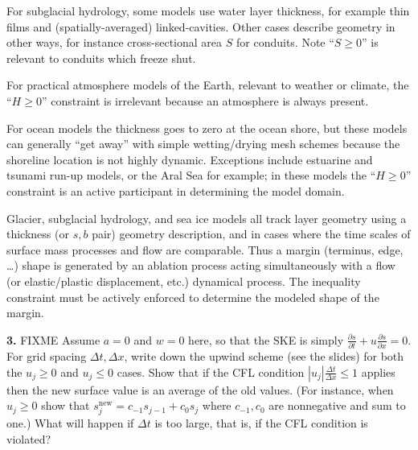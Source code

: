 \documentclass[12pt]{amsart}
\newcommand{\prob}[1]{\bigskip\noindent\textbf{#1.}\quad }
\begin{document}
For subglacial hydrology, some models use water layer thickness, for example thin films and (spatially-averaged) linked-cavities.  Other cases describe geometry in other ways, for instance cross-sectional area $S$ for conduits.  Note ``$S\ge 0$'' is relevant to conduits which freeze shut.

For practical atmosphere models of the Earth, relevant to weather or climate, the ``$H\ge 0$'' constraint is irrelevant because an atmosphere is always present.

For ocean models the thickness goes to zero at the ocean shore, but these models can generally ``get away'' with simple wetting/drying mesh schemes because the shoreline location is not highly dynamic.  Exceptions include estuarine and tsunami run-up models, or the Aral Sea for example; in these models the ``$H\ge 0$'' constraint is an active participant in determining the model domain.

Glacier, subglacial hydrology, and sea ice models all track layer geometry using a thickness (or $s,b$ pair) geometry description, and in cases where the time scales of surface mass processes and flow are comparable.  Thus a margin (terminus, edge, \dots) shape is generated by an ablation process acting simultaneously with a flow (or elastic/plastic displacement, etc.) dynamical process.  The inequality constraint must be actively enforced to determine the modeled shape of the margin.

\prob{3}  FIXME Assume $a=0$ and $w=0$ here, so that the SKE is simply $\frac{\partial s}{\partial t} + u \frac{\partial s}{\partial x} = 0$.  For grid spacing $\Delta t,\Delta x$, write down the upwind scheme (see the slides) for both the $u_j\ge 0$ and $u_j\le 0$ cases.  Show that if the CFL condition $|u_j| \frac{\Delta t}{\Delta x} \le 1$ applies then the new surface value is an average of the old values.  (For instance, when $u_j\ge 0$ show that $s_j^{\text{new}} = c_{-1} s_{j-1} + c_0 s_j$ where $c_{-1},c_0$ are nonnegative and sum to one.)  What will happen if $\Delta t$ is too large, that is, if the CFL condition is violated?
\end{document}
